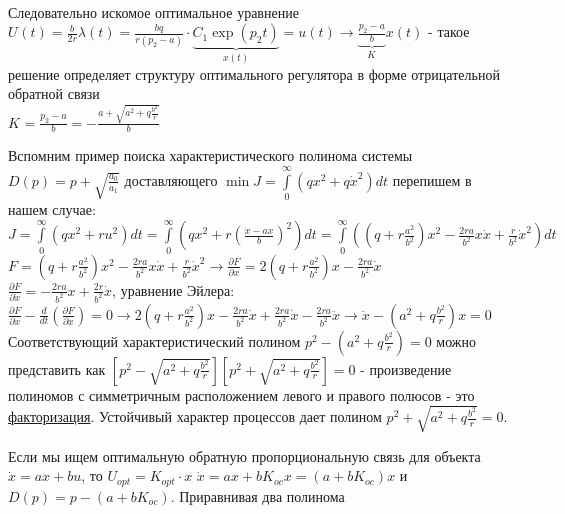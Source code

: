\documentclass[preprint,russian,a5paper,10pt,twoside,mediummath]{ncc}
\begin{document}
\\Следовательно искомое оптимальное уравнение
\\${{U}_{}}\left( t \right)=\frac{b}{2r}\lambda \left( t \right)=\frac{bq}{r\left( {{p}_{2}}-a \right)}\cdot \underbrace{{{C}_{1}}\exp \left( {{p}_{2}}t \right)}_{x\left( t \right)}=u\left( t \right)\to \underbrace{\frac{{{p}_{2}}-a}{b}}_{{{K}_{}}}x\left( t \right)$ - такое решение определяет структуру оптимального регулятора в форме отрицательной обратной связи
\\${{K}_{}}=\frac{{{p}_{2}}-a}{b}=-\frac{a+\sqrt{{{a}^{2}}+q\frac{{{b}^{2}}}{r}}}{b}$   
\par Вспомним пример поиска характеристического полинома системы $D\left( p \right)=p+\sqrt{\frac{{{a}_{0}}}{{{a}_{1}}}}$ доставляющего $\min J=\int\limits_{0}^{\infty }{\left( q{{x}^{2}}+q{{{\dot{x}}}^{2}} \right)}dt$ перепишем в нашем случае:
\\$J=\int\limits_{0}^{\infty }{\left( q{{x}^{2}}+r{{u}^{2}} \right)}dt=\int\limits_{0}^{\infty }{\left( q{{x}^{2}}+r{{\left( \frac{\dot{x}-ax}{b} \right)}^{2}} \right)}dt=\int\limits_{0}^{\infty }{\left( \left( q+r\frac{{{a}^{2}}}{{{b}^{2}}} \right){{x}^{2}}-\frac{2ra}{{{b}^{2}}}x\dot{x}+\frac{r}{{{b}^{2}}}{{{\dot{x}}}^{2}} \right)}dt$
\\$F=\left( q+r\frac{{{a}^{2}}}{{{b}^{2}}} \right){{x}^{2}}-\frac{2ra}{{{b}^{2}}}x\dot{x}+\frac{r}{{{b}^{2}}}{{\dot{x}}^{2}}\to \frac{\partial F}{\partial x}=2\left( q+r\frac{{{a}^{2}}}{{{b}^{2}}} \right)x-\frac{2ra}{{{b}^{2}}}\dot{x}$
\\$\frac{\partial F}{\partial \dot{x}}=-\frac{2ra}{{{b}^{2}}}x+\frac{2r}{{{b}^{2}}}\dot{x}$, уравнение Эйлера:
\\$\frac{\partial F}{\partial x}-\frac{d}{dt}\left( \frac{\partial F}{\partial \dot{x}} \right)=0\to 2\left( q+r\frac{{{a}^{2}}}{{{b}^{2}}} \right)x-\frac{2ra}{{{b}^{2}}}\dot{x}+\frac{2ra}{{{b}^{2}}}\dot{x}-\frac{2ra}{{{b}^{2}}}\ddot{x}\to \ddot{x}-\left( {{a}^{2}}+q\frac{{{b}^{2}}}{r} \right)x=0$
\\Соответствующий характеристический полином ${{p}^{2}}-\left( {{a}^{2}}+q\frac{{{b}^{2}}}{r} \right)=0$ можно представить как $\left[ {{p}^{2}}-\sqrt{{{a}^{2}}+q\frac{{{b}^{2}}}{r}} \right]\left[ {{p}^{2}}+\sqrt{{{a}^{2}}+q\frac{{{b}^{2}}}{r}} \right]=0$ - произведение полиномов с симметричным расположением левого и правого полюсов - это \underline{факторизация}. Устойчивый характер процессов дает полином ${{p}^{2}}+\sqrt{{{a}^{2}}+q\frac{{{b}^{2}}}{r}}=0$.
\par Если мы ищем оптимальную обратную пропорциональную связь для объекта $\dot{x}=ax+bu$, то ${{U}_{opt}}={{K}_{opt}}\cdot x$ $\dot{x}=ax+b{{K}_{oc}}x=\left( a+b{{K}_{oc}} \right)x$ и $D\left( p \right)=p-\left( a+b{{K}_{oc}} \right)$. Приравнивая два полинома 
\end{document}
